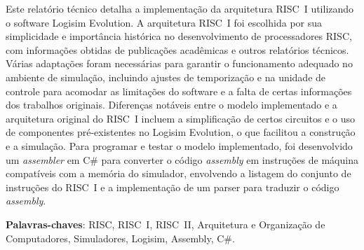 \documentclass[
	article,			%
	11pt,				%
	oneside,			%
	a4paper,			%
	english,			%
	brazil,				%
	sumario=tradicional
	]{abntex2}
\begin{document}
\frenchspacing 


%
%
\maketitle
\begin{resumoumacoluna}
Este relatório técnico detalha a implementação da arquitetura RISC~I utilizando o software Logisim Evolution. A arquitetura RISC~I foi escolhida por sua simplicidade e importância histórica no desenvolvimento de processadores RISC, com informações obtidas de publicações acadêmicas e outros relatórios técnicos. Várias adaptações foram necessárias para garantir o funcionamento adequado no ambiente de simulação, incluindo ajustes de temporização e na unidade de controle para acomodar as limitações do software e a falta de certas informações dos trabalhos originais. Diferenças notáveis entre o modelo implementado e a arquitetura original do RISC~I incluem a simplificação de certos circuitos e o uso de componentes pré-existentes no Logisim Evolution, o que facilitou a construção e a simulação. Para programar e testar o modelo implementado, foi desenvolvido um \textit{assembler} em C\# para converter o código \textit{assembly} em instruções de máquina compatíveis com a memória do simulador, envolvendo a listagem do conjunto de instruções do RISC~I e a implementação de um parser para traduzir o código \textit{assembly}.
 
 \vspace{\onelineskip}
 
 \noindent
 \textbf{Palavras-chaves}: RISC, RISC~I, RISC~II, Arquitetura e Organização de Computadores, Simuladores, Logisim, Assembly, C\#.
\end{resumoumacoluna}
\end{document}
